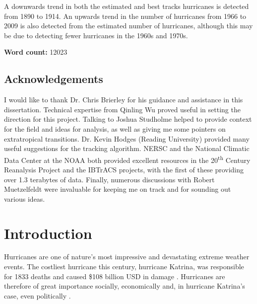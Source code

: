 \documentclass[pdftex,12pt,a4paper]{report}
\newcommand{\ts}{\textsuperscript}
\begin{document}
A downwards trend in both the estimated and best tracks hurricanes is detected from 1890 to 1914. An
upwards trend in the number of hurricanes from 1966 to 2009 is also detected from the estimated
number of hurricanes, although this may be due to detecting fewer hurricanes in the 1960s and 1970s.

\begin{center}
\textbf{Word count:} 12023 %
\end{center}

\newpage
\section*{Acknowledgements}

I would like to thank Dr. Chris Brierley for his guidance and assistance in this dissertation.
Technical expertise from Qinling Wu proved useful in setting the direction for this project.
Talking to Joshua Studholme helped to provide context for the field and ideas for analysis, as well
as giving me some pointers on extratropical transitions.
Dr. Kevin Hodges (Reading University) provided many useful suggestions for the tracking algorithm.
NERSC and the National Climatic Data Center at the NOAA both provided excellent resources in the
20\ts{th} Century Reanalysis Project and the IBTrACS projects, with the first of these providing
over 1.3 terabytes of data.
Finally, numerous discussions with Robert Muetzelfeldt were invaluable for keeping me on track and
for sounding out various ideas.

\newpage

\tableofcontents

\chapter{Introduction}


Hurricanes are one of nature's most impressive and devastating extreme weather events. The costliest
hurricane this century, hurricane Katrina, was responsible for 1833 deaths and caused \$108
billion USD in damage \parencite{knabb2006tropical}.
Hurricanes are therefore of great importance socially,
economically and, in hurricane Katrina's case, even politically \parencite{kellner2007katrina}.
\end{document}
